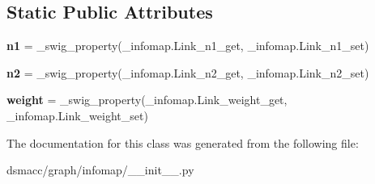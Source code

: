 \subsection*{Static Public Attributes}
\begin{DoxyCompactItemize}
\item 
\mbox{\label{classdsmacc_1_1graph_1_1infomap_1_1Link_a09a3685ea56e6a731e9906efb19e872f}} 
{\bfseries n1} = \+\_\+swig\+\_\+property(\+\_\+infomap.\+Link\+\_\+n1\+\_\+get, \+\_\+infomap.\+Link\+\_\+n1\+\_\+set)
\item 
\mbox{\label{classdsmacc_1_1graph_1_1infomap_1_1Link_a14f8e2d2b4a850824543f06aafd80553}} 
{\bfseries n2} = \+\_\+swig\+\_\+property(\+\_\+infomap.\+Link\+\_\+n2\+\_\+get, \+\_\+infomap.\+Link\+\_\+n2\+\_\+set)
\item 
\mbox{\label{classdsmacc_1_1graph_1_1infomap_1_1Link_a76e37b6103289b3115f36b789be56084}} 
{\bfseries weight} = \+\_\+swig\+\_\+property(\+\_\+infomap.\+Link\+\_\+weight\+\_\+get, \+\_\+infomap.\+Link\+\_\+weight\+\_\+set)
\end{DoxyCompactItemize}


The documentation for this class was generated from the following file\+:\begin{DoxyCompactItemize}
\item 
dsmacc/graph/infomap/\+\_\+\+\_\+init\+\_\+\+\_\+.\+py\end{DoxyCompactItemize}
